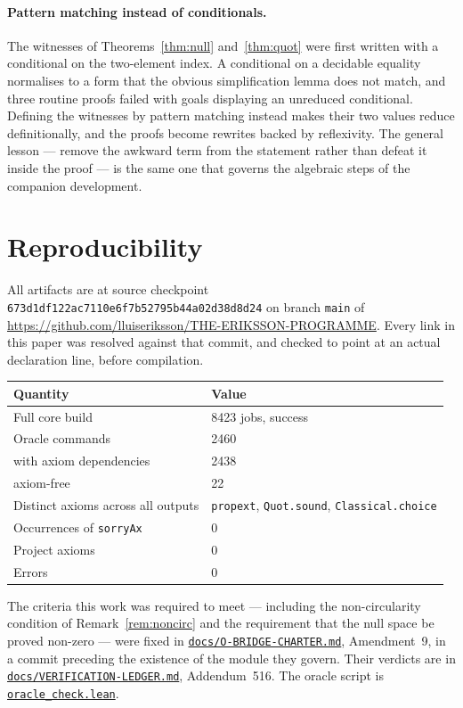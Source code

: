 \documentclass[11pt]{article}
\theoremstyle{definition}
\newcommand{\anchor}{673d1df122ac7110e6f7b52795b44a02d38d8d24}
\newcommand{\repofile}[2]{%
  \href{https://github.com/lluiseriksson/THE-ERIKSSON-PROGRAMME/blob/\anchor/#1}{\nolinkurl{#2}}}
\begin{document}
\paragraph{Pattern matching instead of conditionals.}  The witnesses of
Theorems~\ref{thm:null} and~\ref{thm:quot} were first written with a conditional
on the two-element index.  A conditional on a decidable equality normalises to a
form that the obvious simplification lemma does not match, and three routine
proofs failed with goals displaying an unreduced conditional.  Defining the
witnesses by pattern matching instead makes their two values reduce
definitionally, and the proofs become rewrites backed by reflexivity.  The
general lesson --- remove the awkward term from the statement rather than defeat
it inside the proof --- is the same one that governs the algebraic steps of the
companion development.

\section{Reproducibility}\label{sec:repro}

All artifacts are at source checkpoint \texttt{\anchor} on branch \texttt{main}
of \url{https://github.com/lluiseriksson/THE-ERIKSSON-PROGRAMME}.  Every link in
this paper was resolved against that commit, and checked to point at an actual
declaration line, before compilation.

\begin{center}
\begin{tabular}{ll}
\toprule
Quantity & Value \\
\midrule
Full core build & 8423 jobs, success \\
Oracle commands & 2460 \\
\quad with axiom dependencies & 2438 \\
\quad axiom-free & 22 \\
Distinct axioms across all outputs & \texttt{propext}, \texttt{Quot.sound}, \texttt{Classical.choice} \\
Occurrences of \texttt{sorryAx} & 0 \\
Project axioms & 0 \\
Errors & 0 \\
\bottomrule
\end{tabular}
\end{center}

The criteria this work was required to meet --- including the non-circularity
condition of Remark~\ref{rem:noncirc} and the requirement that the null space be
proved non-zero --- were fixed in
\repofile{docs/O-BRIDGE-CHARTER.md}{docs/O-BRIDGE-CHARTER.md}, Amendment~9, in a
commit preceding the existence of the module they govern.  Their verdicts are in
\repofile{docs/VERIFICATION-LEDGER.md}{docs/VERIFICATION-LEDGER.md},
Addendum~516.  The oracle script is
\repofile{oracle\_check.lean}{oracle\_check.lean}.
\end{document}
